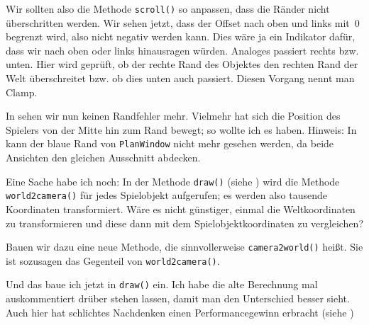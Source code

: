 
Wir sollten also die Methode \texttt{scroll()} so anpassen, dass die Ränder nicht überschritten werden. Wir sehen jetzt, dass der Offset nach oben und links mit~0 begrenzt wird, also nicht negativ werden kann. Dies wäre ja ein Indikator dafür, dass wir nach oben oder links hinausragen würden. Analoges passiert rechts bzw. unten. Hier wird geprüft, ob der rechte Rand des Objektes den rechten Rand der Welt überschreitet bzw. ob dies unten auch passiert. Diesen Vorgang nennt man \Gls{Clamp}.


In  sehen wir nun keinen Randfehler mehr. Vielmehr hat sich die Position des Spielers von der Mitte hin zum Rand bewegt; so wollte ich es haben. Hinweis: In  kann der blaue Rand von \texttt{PlanWindow} nicht mehr gesehen werden, da beide Ansichten den gleichen Ausschnitt abdecken.



Eine Sache habe ich noch: In der Methode \texttt{draw()} (siehe ) wird die Methode \texttt{world2camera()} für jedes Spielobjekt aufgerufen; es werden also tausende Koordinaten transformiert. Wäre es nicht günstiger, einmal die Weltkoordinaten zu transformieren und diese dann mit dem Spielobjektkoordinaten zu vergleichen?

Bauen wir dazu eine neue Methode, die sinnvollerweise \texttt{camera2world()} heißt. Sie ist sozusagen das Gegenteil von \texttt{world2camera()}. 


Und das baue ich jetzt in \texttt{draw()} ein. Ich habe die alte Berechnung mal auskommentiert drüber stehen lassen, damit man den Unterschied besser sieht. Auch hier hat schlichtes Nachdenken einen Performancegewinn erbracht (siehe )

